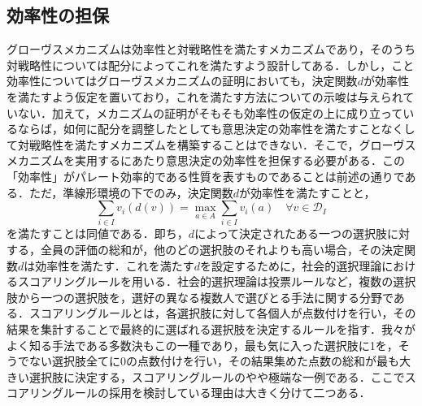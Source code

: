 \documentclass[a4paper, 11pt]{jsarticle}
\begin{document}
\subsection{効率性の担保}
グローヴスメカニズムは効率性と対戦略性を満たすメカニズムであり，そのうち対戦略性については配分によってこれを満たすよう設計してある．しかし，こと効率性についてはグローヴスメカニズムの証明においても，決定関数\(d\)が効率性を満たすよう仮定を置いており，これを満たす方法についての示唆は与えられていない．加えて，メカニズムの証明がそもそも効率性の仮定の上に成り立っているならば，如何に配分を調整したとしても意思決定の効率性を満たすことなくして対戦略性を満たすメカニズムを構築することはできない．そこで，グローヴスメカニズムを実用するにあたり意思決定の効率性を担保する必要がある．この「効率性」がパレート効率的である性質を表すものであることは前述の通りである．ただ，準線形環境の下でのみ，決定関数\(d\)が効率性を満たすことと，
\begin{equation}
\label{efficiency}
\sum_{i \in I}v_i(d(v)) = \max_{a \in A}\sum_{i \in I}v_i(a) \quad \forall v \in \mathscr{D}_I
\end{equation}
を満たすことは同値である．即ち，\(d\)によって決定されたある一つの選択肢に対する，全員の評価の総和が，他のどの選択肢のそれよりも高い場合，その決定関数\(d\)は効率性を満たす．これを満たす\(d\)を設定するために，社会的選択理論におけるスコアリングルールを用いる．社会的選択理論は投票ルールなど，複数の選択肢から一つの選択肢を，選好の異なる複数人で選びとる手法に関する分野である．スコアリングルールとは，各選択肢に対して各個人が点数付けを行い，その結果を集計することで最終的に選ばれる選択肢を決定するルールを指す．我々がよく知る手法である多数決もこの一種であり，最も気に入った選択肢に1を，そうでない選択肢全てに0の点数付けを行い，その結果集めた点数の総和が最も大きい選択肢に決定する，スコアリングルールのやや極端な一例である．ここでスコアリングルールの採用を検討している理由は大きく分けて二つある．
\end{document}
